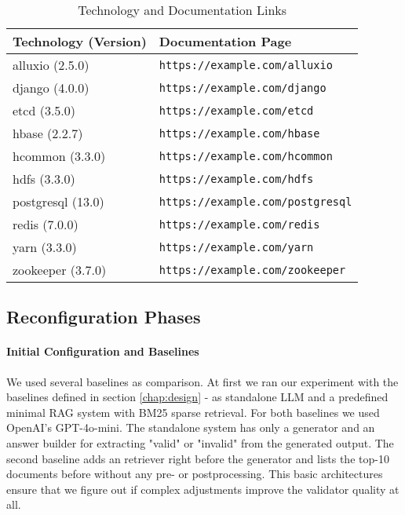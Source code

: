 \begin{table}[h]
    \centering
    \begin{tabular}{|l|l|}
        \hline
        \textbf{Technology (Version)} & \textbf{Documentation Page} \\
        \hline
        alluxio (2.5.0) & \texttt{https://example.com/alluxio} \\
        django (4.0.0) & \texttt{https://example.com/django} \\
        etcd (3.5.0) & \texttt{https://example.com/etcd} \\
        hbase (2.2.7) & \texttt{https://example.com/hbase} \\
        hcommon (3.3.0) & \texttt{https://example.com/hcommon} \\
        hdfs (3.3.0) & \texttt{https://example.com/hdfs} \\
        postgresql (13.0) & \texttt{https://example.com/postgresql} \\
        redis (7.0.0) & \texttt{https://example.com/redis} \\
        yarn (3.3.0) & \texttt{https://example.com/yarn} \\
        zookeeper (3.7.0) & \texttt{https://example.com/zookeeper} \\
        \hline
    \end{tabular}
    \caption{Technology and Documentation Links}
    \label{tab:technology_documentation}
\end{table}

\subsection{Reconfiguration Phases} \label{sec:exp_results} 

\paragraph{Initial Configuration and Baselines} \label{sec:exp_initial_config}
We used several baselines as comparison. At first we ran our experiment with the baselines defined in section \ref{chap:design} - as standalone LLM and a predefined minimal RAG system with BM25 sparse retrieval. For both baselines we used OpenAI's GPT-4o-mini\cite{OpenAI_2022}. The standalone system has only a generator and an answer builder for extracting "valid" or "invalid" from the generated output. The second baseline adds an retriever right before the generator and lists the top-10 documents before without any pre- or postprocessing. This basic architectures ensure that we figure out if complex adjustments improve the validator quality at all.

